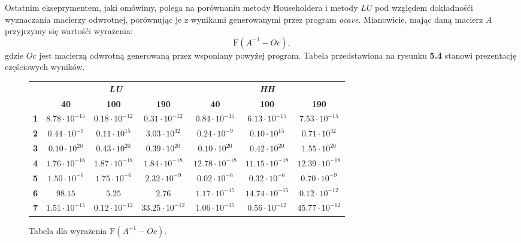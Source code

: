 Ostatnim ekseprymentem, jaki omówimy, polega na porównaniu metody Householdera i metody $LU$ pod względem dokładnośći wyznaczania macierzy odwrotnej,
porównując je z wynikami generowanymi przez program \textit{ocave}. Mianowicie, mając daną macierz $A$ przyjrzymy się wartośći wyrażenia:
$$\textrm{F}(A^{-1} - Oc),$$
gdzie $Oc$ jest macierzą odwrotną generowaną przez wsponiany powyżej program. Tabela przedstawiona na rysunku \textbf{5.4} stanowi prezentację częściowych wyników.
\begin{figure}[h!tb]
\begin{center}
\begin{tabular}{|l||c|c|c||c|c|c|}
\hline
\multirow{2}{*}{} & \multicolumn{3}{|c||}{\textbf{\textit{LU}}} & \multicolumn{3}{|c|}{\textbf{\textit{HH}}}\\
\cline{2-7}
& \textbf{40} & \textbf{100} & \textbf{190} & \textbf{40} & \textbf{100} & \textbf{190} \\
\hline
\hline
\textbf{1} & $8.78 \cdot 10^{-15}$ & $0.18 \cdot 10^{-12}$ & $0.31 \cdot 10^{-12}$ & $0.84 \cdot 10^{-15}$ & $6.13 \cdot 10^{-15}$ & $7.53 \cdot 10^{-15}$ \\
\hline
\textbf{2} & $0.44 \cdot 10^{-9}$ & $0.11 \cdot 10^{15}$ & $3.03 \cdot 10^{32}$ & $0.24 \cdot 10^{-9}$ & $0.10 \cdot 10^{15} $ & $0.71 \cdot 10^{32}$ \\
\hline
\textbf{3} & $0.10 \cdot 10^{20}$ & $0.43\cdot 10^{20}$ & $0.39\cdot 10^{20}$ & $0.10\cdot 10^{20}$ & $0.42\cdot 10^{20}$ & $1.55\cdot 10^{20}$ \\
\hline
\textbf{4} & $1.76 \cdot 10^{-18}$ & $1.87 \cdot 10^{-18}$ & $1.84 \cdot 10^{-18}$ & $12.78 \cdot 10^{-18}$ & $11.15 \cdot 10^{-18}$ & $12.39 \cdot 10^{-18}$ \\
\hline	
\textbf{5} & $1.50 \cdot 10^{-6}$ & $1.75 \cdot 10^{-6}$ & $2.32 \cdot 10^{-9}$ & $0.02 \cdot 10^{-6}$ & $0.32 \cdot 10^{-6}$ & $0.70 \cdot 10^{-9}$ \\
\hline
\textbf{6} & $98.15$ & $5.25$ & $2.76$ & $1.17 \cdot 10^{-15}$ & $14.74 \cdot 10^{-15}$ & $0.12 \cdot 10^{-12}$ \\
\hline
\textbf{7} & $1.51 \cdot 10^{-15}$ & $0.12 \cdot 10^{-12}$ & $33.25 \cdot 10^{-12}$ & $1.06 \cdot 10^{-15}$ & $0.56 \cdot 10^{-12}$ & $45.77 \cdot 10^{-12}$ \\
\hline
\end{tabular}
\caption{Tabela dla wyrażenia $\mathrm{F}(A^{-1}-Oc)$.} 
\end{center}
\end{figure}

